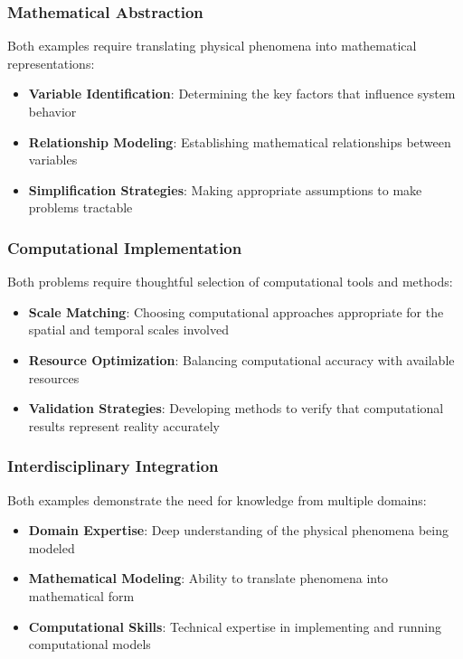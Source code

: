 \subsubsection{Mathematical Abstraction}

Both examples require translating physical phenomena into mathematical representations:
\begin{itemize}
    \item \textbf{Variable Identification}: Determining the key factors that influence system behavior
    \item \textbf{Relationship Modeling}: Establishing mathematical relationships between variables
    \item \textbf{Simplification Strategies}: Making appropriate assumptions to make problems tractable
\end{itemize}

\subsubsection{Computational Implementation}

Both problems require thoughtful selection of computational tools and methods:
\begin{itemize}
    \item \textbf{Scale Matching}: Choosing computational approaches appropriate for the spatial and temporal scales involved
    \item \textbf{Resource Optimization}: Balancing computational accuracy with available resources
    \item \textbf{Validation Strategies}: Developing methods to verify that computational results represent reality accurately
\end{itemize}

\subsubsection{Interdisciplinary Integration}

Both examples demonstrate the need for knowledge from multiple domains:
\begin{itemize}
    \item \textbf{Domain Expertise}: Deep understanding of the physical phenomena being modeled
    \item \textbf{Mathematical Modeling}: Ability to translate phenomena into mathematical form
    \item \textbf{Computational Skills}: Technical expertise in implementing and running computational models
\end{itemize}


